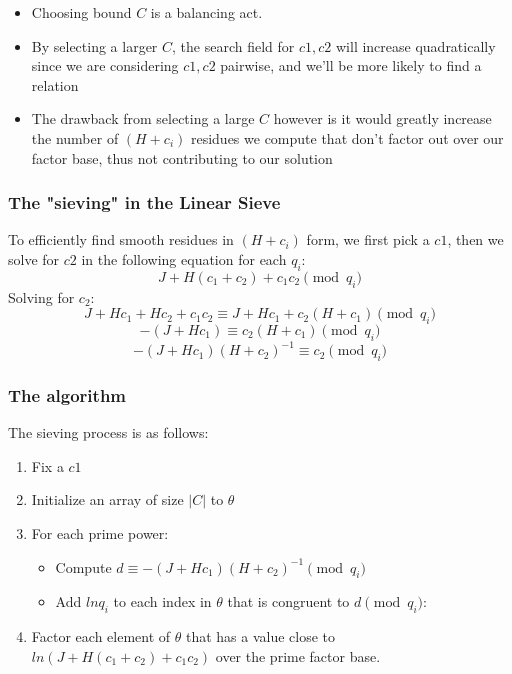 \documentclass{article}
\begin{document}
        \begin{itemize}
          \item Choosing bound $C$ is a balancing act.
          \item By selecting a larger $C$, the search field for $c1, c2$ will increase quadratically since we are considering $c1, c2$ pairwise, and we'll be more likely to find a relation
          \item The drawback from selecting a large $C$ however is it would greatly increase the number of $(H + c_i)$ residues we compute that don't factor out over our factor base, thus not contributing to our solution
        \end{itemize}

        \subsubsection{The "sieving" in the Linear Sieve}

        To efficiently find smooth residues in $(H + c_i)$ form, we first pick a $c1$, then we solve for $c2$ in the following equation for each $q_i$:
        $$J + H(c_1 + c_2) + c_1c_2 \pmod q_i$$
        Solving for $c_2$:
        $$J + Hc_1 + Hc_2 + c_1c_2 \equiv J + Hc_1 + c_2(H + c_1) \pmod{q_i}$$
        $$-(J + Hc_1) \equiv c_2(H + c_1) \pmod{q_i}$$
        $$-(J + Hc_1)(H + c_2)^{-1} \equiv c_2 \pmod{q_i}$$

        \subsubsection{The algorithm}

        The sieving process is as follows:

        \begin{enumerate}
          \item Fix a $c1$
          \item Initialize an array of size $|C|$ to $\theta$
          \item For each prime power: \\
            \begin{itemize}
              \item Compute $d \equiv -(J + Hc_1)(H + c_2)^{-1} \pmod{q_i}$
              \item Add $ln{q_i}$ to each index in $\theta$ that is congruent to $d \pmod{q_i}$: \\
            \end{itemize}
          \item Factor each element of $\theta$ that has a value close to $ln{(J + H(c_1 + c_2) + c_1c_2)}$ over the prime factor base.
        \end{enumerate}
\end{document}
